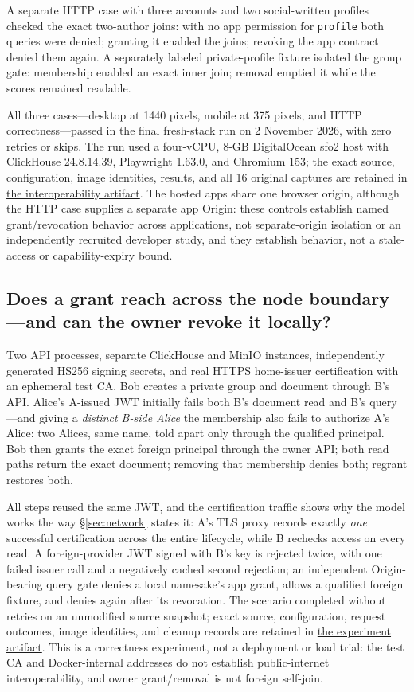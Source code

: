\documentclass[sigconf, nonacm]{acmart}
\newcommand{\artifactbase}{https://github.com/jacoby149/web10}
\newcommand{\domainartifactrev}{26720acba859c7eb03fc5d26a6221cdde5b764a1}
\newcommand{\domainartifactdir}[2]{\href{\artifactbase/tree/\domainartifactrev/#1}{#2}}
\begin{document}
A separate HTTP case with three accounts and two social-written profiles
checked the exact two-author joins: with no app permission for
\texttt{profile} both queries were denied; granting it enabled the joins;
revoking the app contract denied them again. A separately labeled
private-profile fixture isolated the group gate: membership enabled an
exact inner join; removal emptied it while the scores remained readable.

All three cases---desktop at 1440 pixels, mobile at 375 pixels, and HTTP
correctness---passed in the final fresh-stack run on 2 November 2026,
with zero retries or skips. The run used a four-vCPU, 8-GB DigitalOcean
sfo2 host with ClickHouse 24.8.14.39, Playwright 1.63.0, and Chromium
153; the exact source, configuration, image identities, results, and all
16 original captures are retained in
\domainartifactdir{research/interoperability-demo}{the
interoperability artifact}. The hosted apps share one browser origin,
although the HTTP case supplies a separate app Origin: these controls
establish named grant/revocation behavior across applications, not
separate-origin isolation or an independently recruited developer study,
and they establish behavior, not a stale-access or capability-expiry
bound.

\subsection{Does a grant reach across the node boundary---and can the
owner revoke it locally?}
\label{sec:ev-federation}

Two API processes, separate ClickHouse and MinIO instances,
independently generated HS256 signing secrets, and real HTTPS
home-issuer certification with an ephemeral test CA. Bob creates a
private group and document through B's API. Alice's A-issued JWT
initially fails both B's document read and B's query---and giving a
\emph{distinct B-side Alice} the membership also fails to authorize
A's Alice: two Alices, same name, told apart only through the qualified
principal. Bob then grants the exact foreign principal through the owner
API; both read paths return the exact document; removing that
membership denies both; regrant restores both.

All steps reused the same JWT, and the certification traffic shows why
the model works the way \S\ref{sec:network} states it: A's TLS proxy
records exactly \emph{one} successful certification across the entire
lifecycle, while B rechecks access on every read. A foreign-provider JWT
signed with B's key is rejected twice, with one failed issuer call and a
negatively cached second rejection; an independent Origin-bearing query
gate denies a local namesake's app grant, allows a qualified foreign
fixture, and denies again after its revocation. The scenario completed
without retries on an unmodified source snapshot; exact source,
configuration, request outcomes, image identities, and cleanup records
are retained in \domainartifactdir{research/federation-demo}{the
experiment artifact}. This is a correctness experiment, not a deployment
or load trial: the test CA and Docker-internal addresses do not
establish public-internet interoperability, and owner grant/removal is
not foreign self-join.
\end{document}
